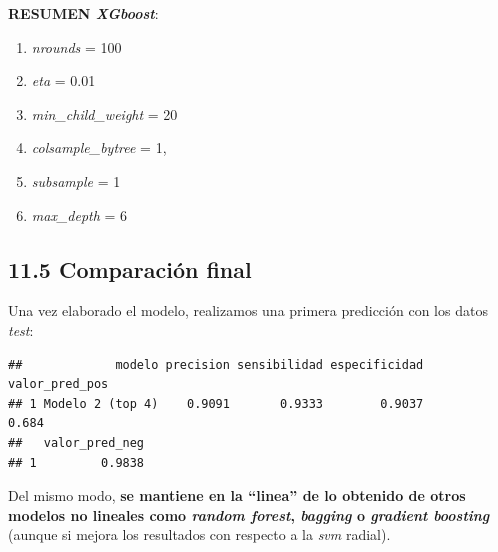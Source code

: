 \documentclass[
]{article}
\providecommand{\tightlist}{%
  \setlength{\itemsep}{0pt}\setlength{\parskip}{0pt}}
\begin{document}
\textbf{RESUMEN \emph{XGboost}}:

\begin{enumerate}
\def\labelenumi{\arabic{enumi}.}
\tightlist
\item
  \emph{nrounds} = 100
\item
  \emph{eta} = 0.01
\item
  \emph{min\_child\_weight} = 20
\item
  \emph{colsample\_bytree} = 1,
\item
  \emph{subsample} = 1
\item
  \emph{max\_depth} = 6
\end{enumerate}

\hypertarget{comparaciuxf3n-final-4}{%
\subsection{11.5 Comparación final}\label{comparaciuxf3n-final-4}}

Una vez elaborado el modelo, realizamos una primera predicción con los
datos \emph{test}:

\begin{verbatim}
##             modelo precision sensibilidad especificidad valor_pred_pos
## 1 Modelo 2 (top 4)    0.9091       0.9333        0.9037          0.684
##   valor_pred_neg
## 1         0.9838
\end{verbatim}

Del mismo modo, \textbf{se mantiene en la ``linea'' de lo obtenido de
otros modelos no lineales como \emph{random forest}, \emph{bagging} o
\emph{gradient boosting}} (aunque si mejora los resultados con respecto
a la \emph{svm} radial).
\end{document}
